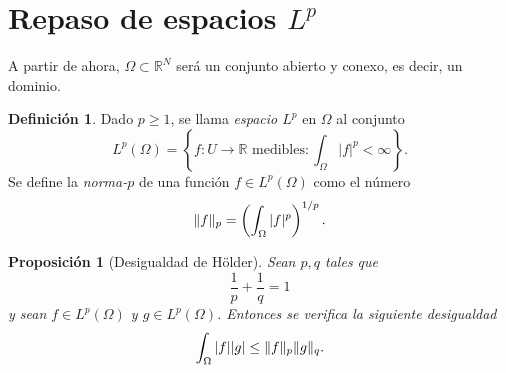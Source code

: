 \documentclass[12pt,a4paper]{book}
\DeclarePairedDelimiter\norm{\lVert}{\rVert}
\newtheorem{prop}[thm]{Proposición}
\theoremstyle{definition} \newtheorem{defn}[thm]{Definición}
\theoremstyle{definition} \newtheorem{ejemplo}[thm]{Ejemplo}
\theoremstyle{definition} \newtheorem{ejercicio}[thm]{Ejercicio}
\theoremstyle{remark} \newtheorem*{obs}{Observación}
\newcommand{\RR}{\mathbb{R}}
\begin{document}
\section{Repaso de espacios $L^p$}

A partir de ahora, $\Omega\subset \RR^N$ será un conjunto abierto y conexo, es decir, un dominio.
\begin{defn}
  Dado $p\geq 1$, se llama \emph{espacio $L^p$} en $\Omega$ al conjunto
  \begin{equation*}
    L^p(\Omega)=\left\{ f:U\rightarrow \RR \text{ medibles} : \int_{\Omega} |f|^p < \infty \right\}.
  \end{equation*}
  Se define la \emph{norma-$p$} de una función $f\in L^p(\Omega)$ como el número
  \begin{equation*}
    \norm{f}_{p}=\left( \int_{\Omega}|f|^p \right)^{1/p}.   
  \end{equation*}
\end{defn}

\begin{prop}[Desigualdad de Hölder]
  Sean $p,q$ tales que 
  \begin{equation*}
    \frac{1}{p}+\frac{1}{q}=1
  \end{equation*}
  y sean
  $f\in L^p(\Omega)$ y $g\in L^p(\Omega)$. Entonces se verifica la siguiente desigualdad
  \begin{equation*}
    \int_{\Omega}|f| |g| \leq \norm{f}_p \norm{g}_q.
  \end{equation*}
\end{prop}
\end{document}
